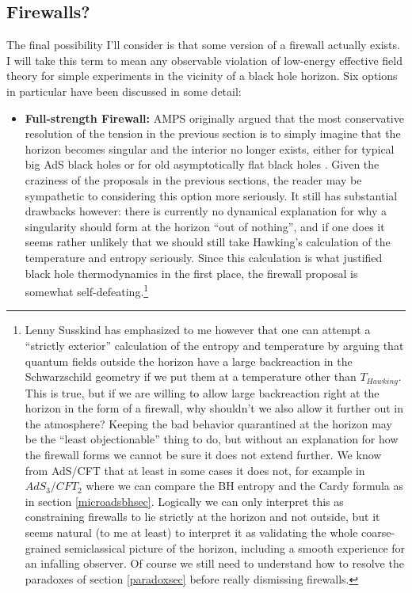 \documentclass[12pt]{article}
\begin{document}
\subsection{Firewalls?}
The final possibility I'll consider is that some version of a firewall actually exists.  I will take this term to mean any observable violation of low-energy effective field theory for simple experiments in the vicinity of a black hole horizon.  Six options in particular have been discussed in some detail:
\begin{itemize}
\item \textbf{Full-strength Firewall:} AMPS originally argued that the most conservative resolution of the tension in the previous section is to simply imagine that the horizon becomes singular and the interior no longer exists, either for typical big AdS black holes or for old asymptotically flat black holes \cite{Almheiri:2012rt,Marolf:2013dba}.  Given the craziness of the proposals in the previous sections, the reader may be sympathetic to considering this option more seriously.  It still has substantial drawbacks however: there is currently no dynamical explanation for why a singularity should form at the horizon ``out of nothing'', and if one does it seems rather unlikely that we should still take Hawking's calculation of the temperature and entropy seriously.  Since this calculation is what justified black hole thermodynamics in the first place, the firewall proposal is somewhat self-defeating.\footnote{Lenny Susskind has emphasized to me however that one can attempt a ``strictly exterior'' calculation of the entropy and temperature by arguing that quantum fields outside the horizon have a large backreaction in the Schwarzschild geometry if we put them at a temperature other than $T_{\mathit{Hawking}}$.
This is true, but if we are willing to allow large backreaction right at the horizon in the form of a firewall, why shouldn't we also allow it further out in the atmosphere?  Keeping the bad behavior quarantined at the horizon may be the ``least objectionable'' thing to do, but without an explanation for how the firewall forms we cannot be sure it does not extend further.  We know from AdS/CFT that at least in some cases it does not, for example in $AdS_3/CFT_2$ where we can compare the BH entropy and the Cardy formula as in section \ref{microadsbhsec}.  Logically we can only interpret this as constraining firewalls to lie strictly at the horizon and not outside, but it seems natural (to me at least) to interpret it as validating the whole coarse-grained semiclassical picture of the horizon, including a smooth experience for an infalling observer.  Of course we still need to understand how to resolve the paradoxes of section \ref{paradoxsec} before really dismissing firewalls.}  

\end{itemize}
\end{document}
